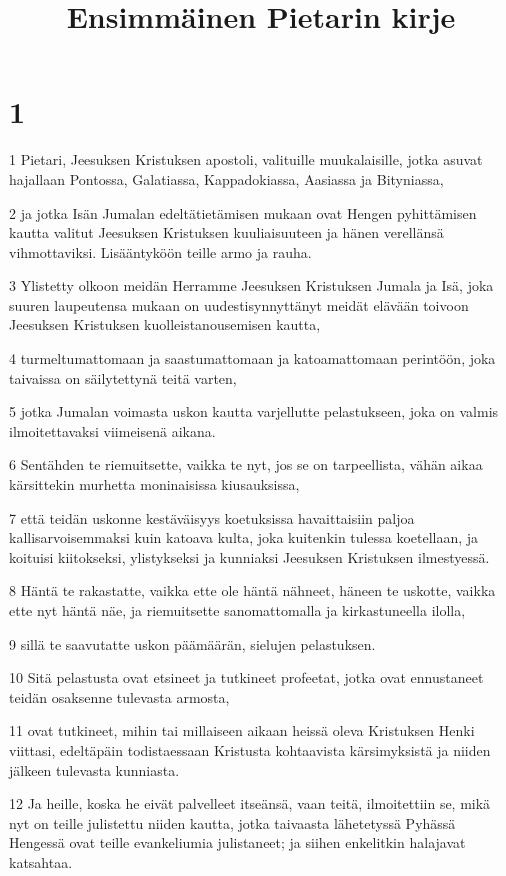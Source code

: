 

\title{Ensimmäinen Pietarin kirje}


\chapter{1}

\par 1 Pietari, Jeesuksen Kristuksen apostoli, valituille muukalaisille, jotka asuvat hajallaan Pontossa, Galatiassa, Kappadokiassa, Aasiassa ja Bityniassa,
\par 2 ja jotka Isän Jumalan edeltätietämisen mukaan ovat Hengen pyhittämisen kautta valitut Jeesuksen Kristuksen kuuliaisuuteen ja hänen verellänsä vihmottaviksi. Lisääntyköön teille armo ja rauha.
\par 3 Ylistetty olkoon meidän Herramme Jeesuksen Kristuksen Jumala ja Isä, joka suuren laupeutensa mukaan on uudestisynnyttänyt meidät elävään toivoon Jeesuksen Kristuksen kuolleistanousemisen kautta,
\par 4 turmeltumattomaan ja saastumattomaan ja katoamattomaan perintöön, joka taivaissa on säilytettynä teitä varten,
\par 5 jotka Jumalan voimasta uskon kautta varjellutte pelastukseen, joka on valmis ilmoitettavaksi viimeisenä aikana.
\par 6 Sentähden te riemuitsette, vaikka te nyt, jos se on tarpeellista, vähän aikaa kärsittekin murhetta moninaisissa kiusauksissa,
\par 7 että teidän uskonne kestäväisyys koetuksissa havaittaisiin paljoa kallisarvoisemmaksi kuin katoava kulta, joka kuitenkin tulessa koetellaan, ja koituisi kiitokseksi, ylistykseksi ja kunniaksi Jeesuksen Kristuksen ilmestyessä.
\par 8 Häntä te rakastatte, vaikka ette ole häntä nähneet, häneen te uskotte, vaikka ette nyt häntä näe, ja riemuitsette sanomattomalla ja kirkastuneella ilolla,
\par 9 sillä te saavutatte uskon päämäärän, sielujen pelastuksen.
\par 10 Sitä pelastusta ovat etsineet ja tutkineet profeetat, jotka ovat ennustaneet teidän osaksenne tulevasta armosta,
\par 11 ovat tutkineet, mihin tai millaiseen aikaan heissä oleva Kristuksen Henki viittasi, edeltäpäin todistaessaan Kristusta kohtaavista kärsimyksistä ja niiden jälkeen tulevasta kunniasta.
\par 12 Ja heille, koska he eivät palvelleet itseänsä, vaan teitä, ilmoitettiin se, mikä nyt on teille julistettu niiden kautta, jotka taivaasta lähetetyssä Pyhässä Hengessä ovat teille evankeliumia julistaneet; ja siihen enkelitkin halajavat katsahtaa.

